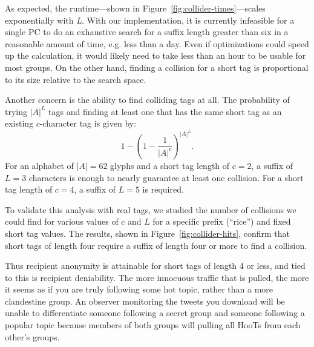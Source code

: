 
As expected, the runtime---shown in
Figure~\ref{fig:collider-times}---scales exponentially with \textit{L}.
With our implementation, it is currently infeasible for a single PC to
do an exhaustive search for a suffix length greater than six in a
reasonable amount of time, e.g. less than a day. Even if optimizations
could speed up the calculation, it would likely need to take less than
an hour to be usable for most groups. On the other hand, finding a collision
for a short tag is proportional to its size relative to the search space.

Another concern is the ability to find colliding tags at all. The
probability of trying $|A|^L$ tags and finding at least one that has the
same short tag as an existing $c$-character tag is given by:
%
\[1-(1-\frac{1}{|A|^c})^{|A|^L}.\]
%
For an alphabet of $|A|=62$ glyphs and a short tag length of $c=2$, a
suffix of $L=3$ characters is enough to nearly guarantee at least one
collision. For a short tag length of $c=4$, a suffix of $L=5$ is
required.  

To validate this analysis with real tags, we studied the number of
collisions we could find for various values of $c$ and $L$ for a
specific prefix (``rice'') and fixed short tag values. The results,
shown in Figure~\ref{fig:collider-hits}, confirm that short tags of
length four require a suffix of length four or more to find a collision.

Thus recipient anonymity is attainable for short tags of length 4 or less, and tied
to this is recipient deniability. The more innocuous traffic that is pulled, the more
it seems as if you are truly following some hot topic, rather than a more clandestine 
group. An observer monitoring the tweets you download will be unable to differentiate 
someone following a secret group and someone following a popular topic because members of
both groups will pulling all HooTs from each other's groups.

